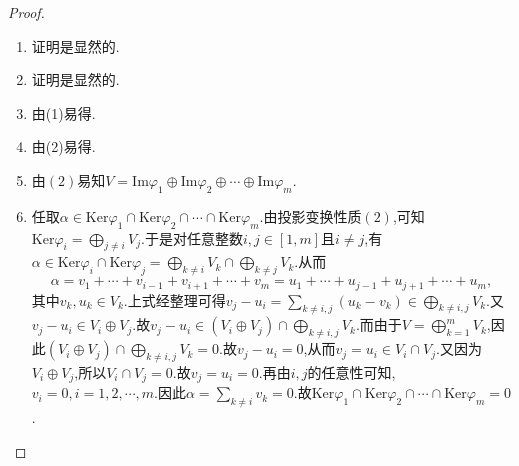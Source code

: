 \documentclass[../../main.tex]{subfiles}%
\begin{document}
\begin{proof}
\begin{enumerate}[(1)]
\item 证明是显然的.

\item 证明是显然的.

\item 由(1)易得.

\item 由(2)易得.

\item 由\((2)\)易知\(V = \text{Im}\varphi_1\oplus\text{Im}\varphi_2\oplus\cdots\oplus\text{Im}\varphi_m\).

\item 任取\(\alpha \in \mathrm{Ker}\varphi_1\cap \mathrm{Ker}\varphi_2\cap \cdots \cap \mathrm{Ker}\varphi_m\).由投影变换性质\((2)\),可知\(\mathrm{Ker}\varphi_i = \bigoplus_{j\neq i}V_j\).于是对任意整数\(i, j\in [1, m]\)且\(i\neq j\),有\(\alpha \in \mathrm{Ker}\varphi_i\cap \mathrm{Ker}\varphi_j = \bigoplus_{k\neq i}V_k\cap \bigoplus_{k\neq j}V_k\).从而
\[
\alpha = v_1 + \cdots + v_{i - 1} + v_{i + 1} + \cdots + v_m = u_1 + \cdots + u_{j - 1} + u_{j + 1} + \cdots + u_m,
\]
其中\(v_k, u_k\in V_k\).上式经整理可得\(v_j - u_i = \sum_{k\neq i, j}(u_k - v_k)\in \bigoplus_{k\neq i, j}V_k\).又\(v_j - u_i\in V_i\oplus V_j\).故\(v_j - u_i\in (V_i\oplus V_j)\cap \bigoplus_{k\neq i, j}V_k\).而由于\(V = \bigoplus_{k = 1}^m V_k\),因此\((V_i\oplus V_j)\cap \bigoplus_{k\neq i, j}V_k = 0\).故\(v_j - u_i = 0\),从而\(v_j = u_i\in V_i\cap V_j\).又因为\(V_i\oplus V_j\),所以\(V_i\cap V_j = 0\).故\(v_j = u_i = 0\).再由\(i, j\)的任意性可知,\(v_i = 0, i = 1, 2, \cdots, m\).因此\(\alpha = \sum_{k\neq i}v_k = 0\).故\(\mathrm{Ker}\varphi_1\cap \mathrm{Ker}\varphi_2\cap \cdots \cap \mathrm{Ker}\varphi_m = 0\).
\end{enumerate}

\end{proof}
\end{document}
